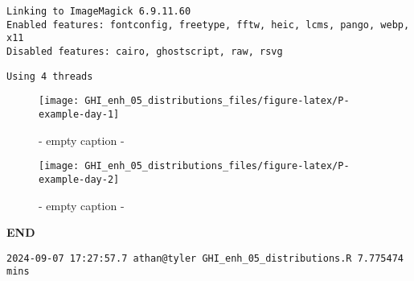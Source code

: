 \documentclass[
  10pt,
  a4paper,oneside]{article}
\begin{document}
\begin{verbatim}
Linking to ImageMagick 6.9.11.60
Enabled features: fontconfig, freetype, fftw, heic, lcms, pango, webp, x11
Disabled features: cairo, ghostscript, raw, rsvg
\end{verbatim}

\begin{verbatim}
Using 4 threads
\end{verbatim}

\begin{figure}[H]

{\centering \texttt{[image: GHI\_enh\_05\_distributions\_files/figure-latex/P-example-day-1]} 

}

\caption{ - empty caption - }\label{fig:P-example-day-1}
\end{figure}
\begin{figure}[H]

{\centering \texttt{[image: GHI\_enh\_05\_distributions\_files/figure-latex/P-example-day-2]} 

}

\caption{ - empty caption - }\label{fig:P-example-day-2}
\end{figure}

\textbf{END}

\begin{verbatim}
2024-09-07 17:27:57.7 athan@tyler GHI_enh_05_distributions.R 7.775474 mins
\end{verbatim}
\end{document}
